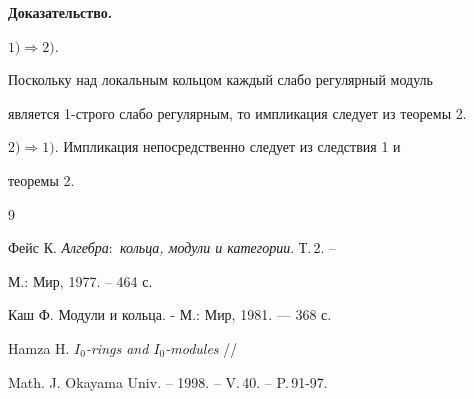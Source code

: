  


{\bf Доказательство.} 


$1)\Rightarrow 2)$. 


Поскольку над локальным кольцом каждый слабо регулярный модуль 


является 1-строго слабо регулярным, то импликация следует из теоремы 2. 


 


$2)\Rightarrow 1)$. Импликация непосредственно следует из следствия 1 и 


теоремы 2. 


 


\begin{thebibliography}{9} 


 




Фейс К. {\em Алгебра$:$ кольца, модули и категории}. Т.\,2. -- 


М.: Мир, 1977. -- 464 с. 




Каш Ф. Модули и кольца. - М.: Мир, 1981. --- 368 с. 




Hamza H. {\em $I_0$-rings and $I_0$-modules} // 


Math. J. Okayama Univ. -- 1998. -- V.\,40. -- P.\,91-97. 


 


\end{thebibliography} 


 


\vskip 2cm 


 






 


\label{end} 


 


